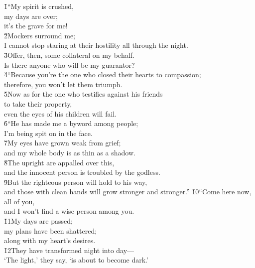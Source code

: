 \begin{poetry}
\poeml {}
\v{1}``My spirit is crushed, \\
\poemll    my days are over; \\
\poemlll       it's the grave for me! \\
\poeml \v{2}Mockers surround me; \\
\poemll    I cannot stop staring at their hostility all through the night. \\
\poeml \v{3}Offer, then, some collateral on my behalf. \\
\poemll    Is there anyone who will be my guarantor? \\
\poeml \v{4}``Because you're the one who closed their hearts to compassion; \\
\poemll    therefore, you won't let them triumph. \\
\poeml \v{5}Now as for the one who testifies against his friends \\
\poemll    to take their property, \\
\poemlll       even the eyes of his children will fail. \\
\poeml \v{6}``He has made me a byword among people; \\
\poemll    I'm being spit on in the face. \\
\poeml \v{7}My eyes have grown weak from grief; \\
\poemll    and my whole body is as thin as a shadow. \\
\poeml \v{8}The upright are appalled over this, \\
\poemll    and the innocent person is troubled by the godless. \\
\poeml \v{9}But the righteous person will hold to his way, \\
\poemll    and those with clean hands will grow stronger and stronger.''
\poeml \v{10}``Come here now, all of you, \\
\poemll    and I won't find a wise person among you. \\
\poeml \v{11}My days are passed; \\
\poemll    my plans have been shattered; \\
\poemlll       along with my heart's desires. \\
\poeml \v{12}They have transformed night into day--- \\
\poemll    `The light,' they say, `is about to become dark.' \\

\end{poetry}
